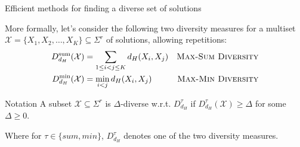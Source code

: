\documentclass{beamer}
\begin{document}


\begin{frame}{Efficient methods for finding a diverse set of solutions}

    More formally, let's consider the following two diversity measures for a multiset $\mathcal{X} = \{X_1, X_2, \ldots, X_K\} \subseteq \Sigma^r$ of solutions, allowing repetitions:
    \begin{align}
        D_{d_H}^{\text{sum}} (\mathcal{X}) & = \sum_{1 \leq i < j \leq K} d_H(X_i, X_j) & \text{\textsc{Max-Sum Diversity}} \\
        D_{d_H}^{\text{min}} (\mathcal{X}) & = \min_{i < j} d_H(X_i, X_j)               & \text{\textsc{Max-Min Diversity}}
    \end{align}

    \begin{block}{Notation}
        A subset $\mathcal{X} \subseteq \Sigma^r$ is $\Delta$-diverse w.r.t. $D_{d_H}^{\tau}$ if $D_{d_H}^{\tau}(\mathcal{X}) \geq \Delta$ for some $\Delta \geq 0$.
    \end{block}
    Where for $\tau \in \{sum, min\}$, $D_{d_H}^{\tau}$ denotes one of the two diversity measures.
\end{frame}
\end{document}
